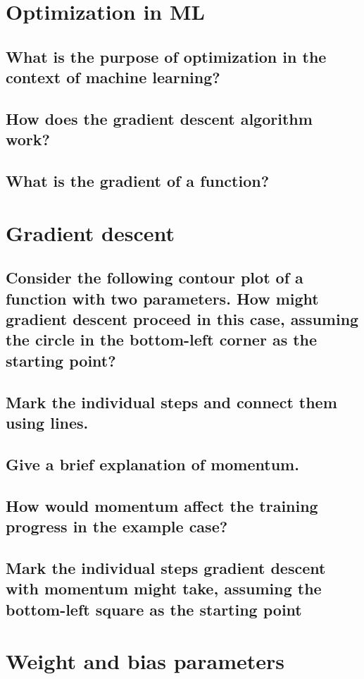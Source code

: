 \section{Optimization in ML}
\subsection{What is the purpose of optimization in the context of machine learning?}
\subsection{How does the gradient descent algorithm work?}
\subsection{What is the gradient of a function? }


\section{Gradient descent}
\subsection{Consider the following contour plot of a function with two parameters. How might gradient descent proceed in this case, assuming the circle in the bottom-left corner as the starting point?}
\subsection{Mark the individual steps and connect them using lines.}
\subsection{Give a brief explanation of momentum.}
\subsection{How would momentum affect the training progress in the example case?}
\subsection{Mark the individual steps gradient descent with momentum might take, assuming the bottom-left square as the starting point}

\section{Weight and bias parameters}

